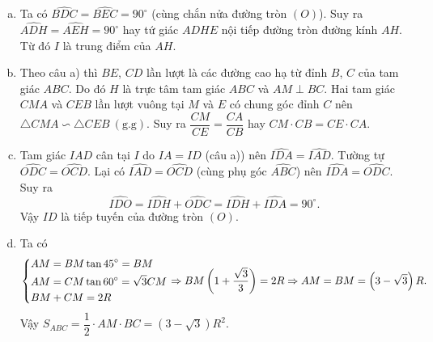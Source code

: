 \begin{ex}
{\begin{center}
\end{center}
\begin{enumerate}[a)]
\item Ta có $\widehat{BDC}=\widehat{BEC}=90^\circ$ (cùng chắn nửa đường tròn $(O)$). Suy ra $\widehat{ADH}=\widehat{AEH}=90^\circ$ hay tứ giác $ADHE$ nội tiếp đường tròn đường kính $AH$. Từ đó $I$ là trung điểm của $AH$.
\item Theo câu a) thì $BE$, $CD$ lần lượt là các đường cao hạ từ đỉnh $B$, $C$ của tam giác $ABC$. Do đó $H$ là trực tâm tam giác $ABC$ và $AM \perp BC$. Hai tam giác $CMA$ và $CEB$ lần lượt vuông tại $M$ và $E$ có chung góc đỉnh $C$ nên $\triangle CMA \backsim  \triangle CEB\ (\text{g.g})$. Suy ra $\dfrac{CM}{CE}=\dfrac{CA}{CB}$ hay $CM \cdot CB =CE \cdot CA$.
\item Tam giác $IAD$ cân tại $I$ do $IA=ID$ (câu a)) nên $\widehat{IDA}=\widehat{IAD}$. Tường tự $\widehat{ODC}=\widehat{OCD}$. Lại có $\widehat{IAD}=\widehat{OCD}$ (cùng phụ góc $\widehat{ABC}$) nên $\widehat{IDA}=\widehat{ODC}$. Suy ra $$\widehat{IDO}=\widehat{IDH}+\widehat{ODC}=\widehat{IDH}+\widehat{IDA}=90^\circ.$$
Vậy $ID$ là tiếp tuyến của đường tròn $(O)$.
\item Ta có 
\begin{align*}
\left\{\begin{aligned}&AM=BM\tan 45^\circ=BM\\ &AM=CM\tan 60^\circ= \sqrt{3}CM\\ &BM+CM=2R\end{aligned}\right. \Rightarrow BM\left(1+\dfrac{\sqrt{3}}{3}\right)=2R \Rightarrow AM=BM=\left(3-\sqrt{3}\right)R.
\end{align*}
Vậy $S_{ABC}=\dfrac{1}{2}\cdot AM\cdot BC= \left(3-\sqrt{3}\right)R^2$.
\end{enumerate}
} 
\end{ex}
 
